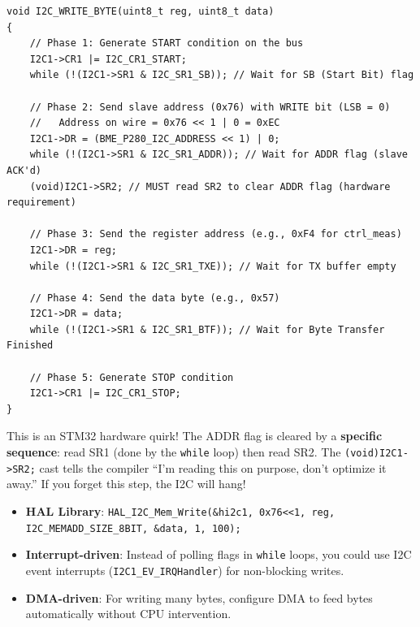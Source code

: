 \documentclass[12pt, a4paper]{article}
\begin{document}
\begin{codebox}
\begin{lstlisting}[style=CStyle]
void I2C_WRITE_BYTE(uint8_t reg, uint8_t data)
{
    // Phase 1: Generate START condition on the bus
    I2C1->CR1 |= I2C_CR1_START;
    while (!(I2C1->SR1 & I2C_SR1_SB)); // Wait for SB (Start Bit) flag

    // Phase 2: Send slave address (0x76) with WRITE bit (LSB = 0)
    //   Address on wire = 0x76 << 1 | 0 = 0xEC
    I2C1->DR = (BME_P280_I2C_ADDRESS << 1) | 0;
    while (!(I2C1->SR1 & I2C_SR1_ADDR)); // Wait for ADDR flag (slave ACK'd)
    (void)I2C1->SR2; // MUST read SR2 to clear ADDR flag (hardware requirement)

    // Phase 3: Send the register address (e.g., 0xF4 for ctrl_meas)
    I2C1->DR = reg;
    while (!(I2C1->SR1 & I2C_SR1_TXE)); // Wait for TX buffer empty

    // Phase 4: Send the data byte (e.g., 0x57)
    I2C1->DR = data;
    while (!(I2C1->SR1 & I2C_SR1_BTF)); // Wait for Byte Transfer Finished

    // Phase 5: Generate STOP condition
    I2C1->CR1 |= I2C_CR1_STOP;
}
\end{lstlisting}
\end{codebox}

\begin{warnbox}
This is an STM32 hardware quirk! The ADDR flag is cleared by a \textbf{specific sequence}: read SR1 (done by the \texttt{while} loop) then read SR2. The \texttt{(void)I2C1->SR2;} cast tells the compiler ``I'm reading this on purpose, don't optimize it away.'' If you forget this step, the I2C will hang!
\end{warnbox}

\begin{altbox}
\begin{itemize}[leftmargin=1.5em]
    \item \textbf{HAL Library}: \texttt{HAL\_I2C\_Mem\_Write(\&hi2c1, 0x76<<1, reg, I2C\_MEMADD\_SIZE\_8BIT, \&data, 1, 100);}
    \item \textbf{Interrupt-driven}: Instead of polling flags in \texttt{while} loops, you could use I2C event interrupts (\texttt{I2C1\_EV\_IRQHandler}) for non-blocking writes.
    \item \textbf{DMA-driven}: For writing many bytes, configure DMA to feed bytes automatically without CPU intervention.
\end{itemize}
\end{altbox}
\end{document}
